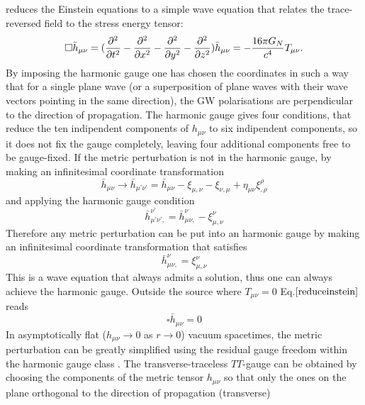 \documentclass[binding=0.6cm, LaM]{sapthesis}
\begin{document}
	reduces the Einstein equations to a simple wave equation that relates the trace-reversed field
 	to the stress energy tensor:
		\begin{equation}
			\label{reduceinstein}
			\square {\bar h}_{\mu\nu} =({\partial^2 \over {\partial t^2} } - {\partial^2 \over {\partial x^2}}  - {\partial^2 \over {\partial y^2}}  -  {\partial^2 \over {\partial z^2}}) {\bar h}_{\mu\nu} = -{{16\pi G_{N}} \over {c^4}}T_{\mu\nu}. 
		\end{equation}
	By imposing the harmonic gauge one has chosen the coordinates in such a way that for a single plane wave 
	(or a superposition of plane waves with their wave vectors pointing in the same direction),
	the GW polarisations are perpendicular to the direction of propagation.
	The harmonic gauge gives four conditions, that reduce the ten indipendent components of  
	$h_{\mu\nu}$ to six indipendent components, so it does not fix the gauge completely,
	leaving four additional components free to be gauge-fixed.
	If the metric perturbation is not in the harmonic gauge, by making an infinitesimal coordinate transformation
		\begin{equation}
			{\bar h}_{\mu\nu} \rightarrow {\bar h}_{\mu’\nu’}  = {\bar h}_{\mu\nu}  - \xi_{\mu,\nu} -\xi_{\nu,\mu} + \eta_{\mu\nu}\xi^{\rho}_{,\rho}
		\end{equation}
	and applying the harmonic gauge condition
		\begin{equation}
			{\bar h}_{\mu’\nu’,} ^{\nu’} = {\bar h}_{\mu\nu,} ^{\nu} - \xi_{\mu,\nu}^{\nu}
		\end{equation}
	Therefore any metric perturbation can be put into an harmonic gauge by making an infinitesimal 
	coordinate transformation that satisfies
		\begin{equation}
			{\bar h}_{\mu\nu,} ^{\nu} = \xi_{\mu,\nu}^{\nu}
		\end{equation}
	This is a wave equation that always admits a solution, thus one can always achieve the harmonic gauge. 
	Outside the source where $T_{\mu\nu} = 0$ Eq.$\ref{reduceinstein}$ reads 
		\begin{equation}
			\square {\bar h}_{\mu\nu} = 0
		\end{equation}
	In asymptotically flat ($h_{\mu\nu} \rightarrow 0$ as $r \rightarrow 0$) vacuum spacetimes, 
	the metric perturbation can be greatly simplified using
	the residual gauge freedom within the harmonic gauge class \cite{4}. 
	The transverse-traceless $TT$-gauge can be obtained by choosing the components of the metric tensor $h_{\mu\nu}$
	so that only the ones on the plane orthogonal to the direction of propagation (transverse) 
\end{document}
